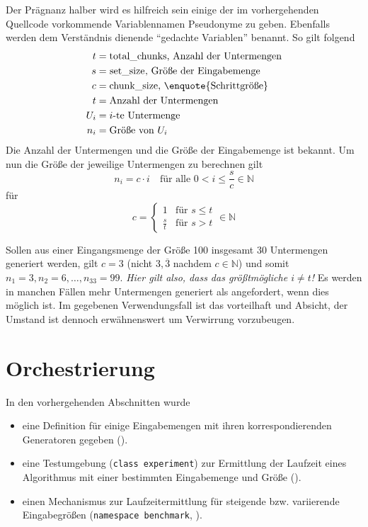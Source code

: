 Der Prägnanz halber wird es hilfreich sein einige der im vorhergehenden Quellcode vorkommende Variablennamen Pseudonyme zu geben. Ebenfalls werden dem Verständnis dienende \enquote{gedachte Variablen} benannt. So gilt folgend
%
\begin{equation*}
	\begin{aligned}
		t &= \text{\lstinline{total_chunks}, Anzahl der Untermengen} \\
		s &= \text{\lstinline{set_size}, Größe der Eingabemenge} \\
		c &= \text{\lstinline{chunk_size}, \enquote{Schrittgröße}} \\
		t &= \text{Anzahl der Untermengen} \\
		U_i &= \text{$i$-te Untermenge} \\
		n_i &= \text{Größe von $U_i$} \\
	\end{aligned}
\end{equation*}
%
Die Anzahl der Untermengen und die Größe der Eingabemenge ist bekannt. Um nun die Größe der jeweilige Untermengen zu berechnen gilt
\begin{equation*}
	n_i = c \cdot i \quad \text{für alle $0 < i \leq \frac{s}{c} \in \mathbb{N}$}
\end{equation*}
für
\begin{equation*}
	c = \begin{cases}
		1 & \text{für $s \leq t$}\\
		\frac{s}{t} & \text{für $s > t$}
	\end{cases} \in \mathbb{N}
\end{equation*}

Sollen aus einer Eingangsmenge der Größe 100 insgesamt 30 Untermengen generiert werden, gilt $c = 3$ (nicht $3,\overline{3}$ nachdem $c \in \mathbb{N}$) und somit $n_1 = 3, n_2 = 6, \ldots, n_{33} = 99$. \emph{Hier gilt also, dass das größtmögliche $i \neq t$!} Es werden in manchen Fällen mehr Untermengen generiert als angefordert, wenn dies möglich ist. Im gegebenen Verwendungsfall ist das vorteilhaft und Absicht, der Umstand ist dennoch erwähnenswert um Verwirrung vorzubeugen.

\section{Orchestrierung}

In den vorhergehenden Abschnitten wurde

\begin{itemize}
    \item eine Definition für einige Eingabemengen mit ihren korrespondierenden Generatoren gegeben ().
    \item eine Testumgebung (\lstinline{class experiment}) zur Ermittlung der Laufzeit eines Algorithmus mit einer bestimmten Eingabemenge und Größe ().
    \item einen Mechanismus zur Laufzeitermittlung für steigende bzw. variierende Eingabegrößen (\lstinline{namespace benchmark}, ).
\end{itemize}

